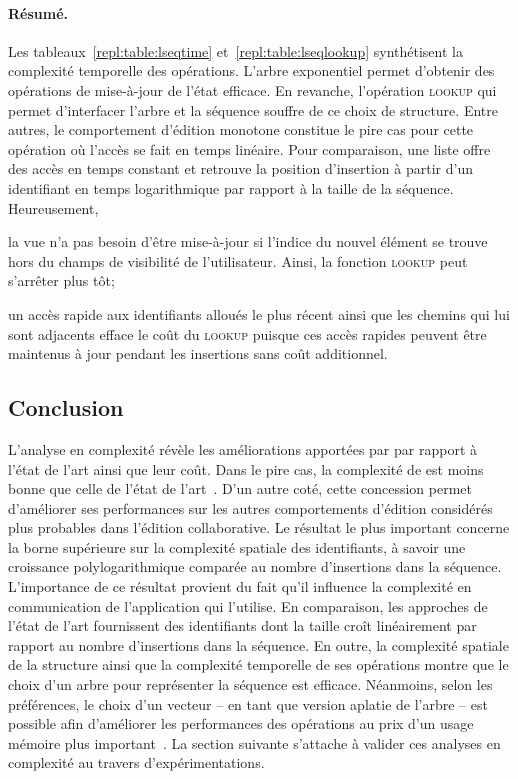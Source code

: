 \paragraph{Résumé.} Les tableaux~\ref{repl:table:lseqtime}
et~\ref{repl:table:lseqlookup} synthétisent la complexité temporelle des
opérations. L'arbre exponentiel permet d'obtenir des opérations de mise-à-jour
de l'état efficace. En revanche, l'opération \textsc{lookup} qui permet
d'interfacer l'arbre et la séquence souffre de ce choix de structure.  Entre
autres, le comportement d'édition monotone constitue le pire cas pour cette
opération où l'accès se fait en temps linéaire. Pour comparaison, une liste
offre des accès en temps constant et retrouve la position d'insertion à partir
d'un identifiant en temps logarithmique par rapport à la taille de la
séquence. Heureusement,
\begin{inparaenum}[(i)]
\item la vue n'a pas besoin d'être mise-à-jour si l'indice du nouvel élément se
  trouve hors du champs de visibilité de l'utilisateur. Ainsi, la fonction
  \textsc{lookup} peut s'arrêter plus tôt;
\item un accès rapide aux identifiants alloués le plus récent ainsi que les
  chemins qui lui sont adjacents efface le coût du \textsc{lookup} puisque ces
  accès rapides peuvent être maintenus à jour pendant les insertions sans coût
  additionnel.
\end{inparaenum}

\subsection{Conclusion}

L'analyse en complexité révèle les améliorations apportées par \LSEQ par rapport
à l'état de l'art ainsi que leur coût. Dans le pire cas, la complexité de \LSEQ
est moins bonne que celle de l'état de l'art~\cite{preguica2009commutative,
  weiss2009logoot}.  D'un autre coté, cette concession permet d'améliorer ses
performances sur les autres comportements d'édition considérés plus probables
dans l'édition collaborative. Le résultat le plus important concerne la borne
supérieure sur la complexité spatiale des identifiants, à savoir une croissance
polylogarithmique comparée au nombre d'insertions dans la séquence. L'importance
de ce résultat provient du fait qu'il influence la complexité en communication
de l'application qui l'utilise. En comparaison, les approches de l'état de
l'art fournissent des identifiants dont la taille croît linéairement par rapport
au nombre d'insertions dans la séquence.  En outre, la complexité spatiale de la
structure ainsi que la complexité temporelle de ses opérations montre que le
choix d'un arbre pour représenter la séquence est efficace. Néanmoins, selon les
préférences, le choix d'un vecteur -- en tant que version aplatie de l'arbre --
est possible afin d'améliorer les performances des opérations au prix d'un usage
mémoire plus important~\cite{weiss2009logoot}. La section suivante s'attache à
valider ces analyses en complexité au travers d'expérimentations.


